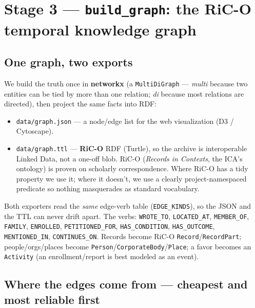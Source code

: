 \documentclass[11pt]{article}
\newcommand{\code}[1]{\texttt{\small #1}}
\begin{document}
\section{Stage 3 --- \texttt{build\_graph}: the RiC-O temporal knowledge graph}

\subsection{One graph, two exports}

We build the truth once in \textbf{networkx} (a \code{MultiDiGraph} --- \emph{multi} because two
entities can be tied by more than one relation; \emph{di} because most relations are directed), then
project the same facts into RDF:

\begin{itemize}[leftmargin=1.4em]
  \item \code{data/graph.json} --- a node/edge list for the web visualization (D3 / Cytoscape).
  \item \code{data/graph.ttl} --- \textbf{RiC-O} RDF (Turtle), so the archive is interoperable Linked
        Data, not a one-off blob. RiC-O (\emph{Records in Contexts}, the ICA's ontology) is proven on
        scholarly correspondence. Where RiC-O has a tidy property we use it; where it doesn't, we use a
        clearly project-namespaced predicate so nothing masquerades as standard vocabulary.
\end{itemize}

Both exporters read the \emph{same} edge-verb table (\code{EDGE\_KINDS}), so the JSON and the TTL can
never drift apart. The verbs: \code{WROTE\_TO}, \code{LOCATED\_AT}, \code{MEMBER\_OF}, \code{FAMILY},
\code{ENROLLED}, \code{PETITIONED\_FOR}, \code{HAS\_CONDITION}, \code{HAS\_OUTCOME},
\code{MENTIONED\_IN}, \code{CONTINUES\_ON}. Records become RiC-O \code{Record}/\code{RecordPart};
people/orgs/places become \code{Person}/\code{CorporateBody}/\code{Place}; a favor becomes an
\code{Activity} (an enrollment/report is best modeled as an event).

\subsection{Where the edges come from --- cheapest and most reliable first}
\end{document}
